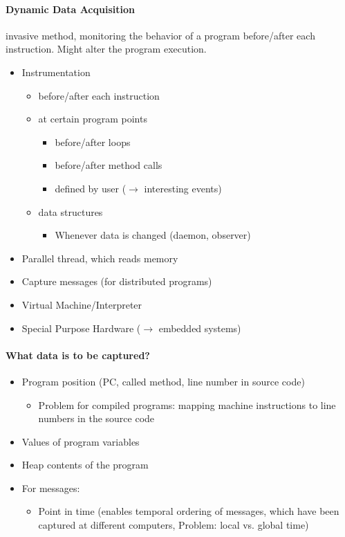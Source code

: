 \documentclass[10pt,a4paper]{article}
\begin{document}
		\paragraph{Dynamic Data Acquisition} invasive method, monitoring the behavior of a program before/after each instruction. Might alter the program execution.
		\begin{itemize}
			\item Instrumentation
			\begin{itemize}
				\item before/after each instruction
				\item at certain program points
				\begin{itemize}
					\item before/after loops
					\item before/after method calls
					\item defined by user ($\rightarrow$ interesting events)
				\end{itemize}
				\item data structures
				\begin{itemize}
					\item Whenever data is changed (daemon, observer)
				\end{itemize}
			\end{itemize}
			\item Parallel thread, which reads memory
			\item Capture messages (for distributed programs)
			\item Virtual Machine/Interpreter
			\item Special Purpose Hardware ($\rightarrow$ embedded systems)
		\end{itemize}
	
		\paragraph{What data is to be captured?}
		\begin{itemize}
			\item Program position (PC, called method, line number in source
			code)
			\begin{itemize}
				\item Problem for compiled programs: mapping machine instructions to line numbers in the source code
			\end{itemize}
			\item Values of program variables
			\item Heap contents of the program
			\item For messages:
			\begin{itemize}
				\item Point in time (enables temporal ordering of messages, which have been captured at different computers, Problem: local vs. global time)
			\end{itemize}
		\end{itemize}
	
\end{document}

